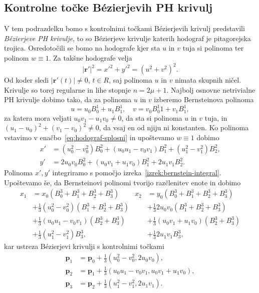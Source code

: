 \documentclass[isrm2, tisk]{fmfdelo}
\newcommand{\p}{\mathbf{p}}
\begin{document}
    \subsection{Kontrolne točke Bézierjevih PH krivulj}
    V tem podrazdelku bomo s kontrolnimi točkami Bézierjevih krivulj predstavili \textit{Bézierjeve PH krivulje}, to so Bézierjeve krivulje katerih hodograf je pitagorejska trojica.
    Osredotočili se bomo na hodografe kjer sta $u$ in $v$ tuja si polinoma ter polinom $w\equiv 1$.
    Za takšne hodografe velja
    \[|\mathbf{r'}|^2 = x'^2 + y'^2 = (u^2+v^2)^2.\]
    Od koder sledi $|\mathbf{r'}(t)|\neq 0$, $t\in R$, saj polinoma $u$ in $v$ nimata skupnih ničel.
    Krivulje so torej regularne in lihe stopnje $n=2\mu+1$.
    Najbolj osnovne netrivialne PH krivulje dobimo tako, da za polinoma $u$ in $v$ izberemo Bernsteinova polinoma
    \[u=u_0B_{0}^{1}+u_1B_{1}^{1},\quad v=v_0B^1_{0}{1}+v_1B_{1}^{1},\]
    za katera mora veljati $u_0v_1-u_1v_0\neq 0$, da sta si polinoma $u$ in $v$ tuja, in $(u_1-u_0)^2+(v_1-v_0)^2\neq 0$, da vsaj en od njiju ni konstanten.
    Ko polinoma vstavimo v enačbo~\eqref{eq:hodograf-splosni} in upoštevamo $w\equiv 1$ dobimo
    \begin{align*}
        x' &=(u_0^2-v_0^2)B_{0}^{2}+(u_0u_1-v_0v_1)B_{1}^{2} + (u_1^2-v_1^2)B_{2}^{2},\\
        y' &= 2u_0 v_0 B_{0}^{2}+(u_0v_1+u_1v_0)B_{1}^{2}+2u_1 v_1 B_{2}^{2}.
    \end{align*}
    Polinoma $x',y'$ integriramo s pomočjo izreka~\ref{izrek:bernstein-integral}.
    Upoštevamo še, da Bernsteinovi polinomi tvorijo razčlenitev enote in dobimo
    \begin{align*}
        x_1 &= x_0(B_{0}^{3} + B_{1}^{3} + B_{2}^{3}+ B_{3}^{3}) & x_2 &= y_0(B_{0}^{3} + B_{1}^{3} + B_{2}^{3}+ B_{3}^{3}) \\
        &+ \frac{1}{3}(u_0^2-v_0^2)(B_{1}^{3} + B_{2}^{3}+ B_{3}^{3})    &     &+ \frac{1}{3}2u_0 v_0(B_{1}^{3} + B_{2}^{3}+ B_{3}^{3}) \\
        &+ \frac{1}{3}(u_0u_1-v_0v_1)(B_{2}^{3}+ B_{3}^{3})          &     &+ \frac{1}{3}(u_0v_1+u_1v_0)(B_{2}^{3}+ B_{3}^{3})\\
        &+ \frac{1}{3} (u_1^2-v_1^2)B_{3}^{3},                        &     &+ \frac{1}{3} 2u_1 v_1 B_{3}^{3},
    \end{align*}
    kar ustreza Bézierjevi krivulji s kontrolnimi točkami
    \begin{align}
        \p_1 &=\p_0+\frac{1}{3}(u_0^2-v_0^2,2u_0v_0), \nonumber\\
        \p_2 &= \p_1+\frac{1}{3}(u_0u_1-v_0v_1, u_0v_1+u_1v_0),\nonumber\\
        \p_3 &= \p_2 + \frac{1}{3}(u_1^2-v_1^2, 2u_1v_1). \label{eq:ph-kontrolne}
    \end{align}
\end{document}
